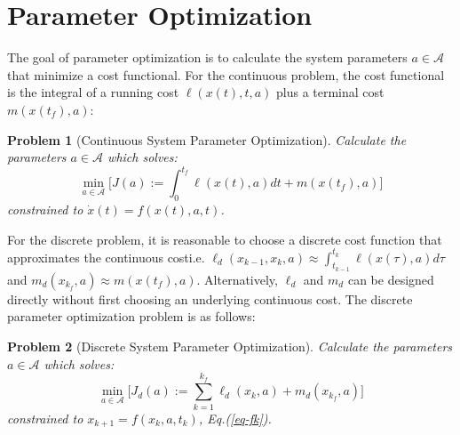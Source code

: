 \documentclass[letterpaper, 10pt, conference]{ieeeconf}
\newtheorem{problem}{Problem}
\begin{document}

\section{Parameter Optimization}
The goal of parameter optimization is to calculate the system parameters $a\in\mathcal{A}$ that minimize a cost functional.  For the continuous problem, the cost functional is the integral of a running cost $\ell(x(t),t,a)$ plus a terminal cost $m(x(t_f),a)$:
\begin{problem}[Continuous System Parameter Optimization]
Calculate the parameters $a\in\mathcal{A}$ which solves:
\[
\min_{a\in\mathcal{A}} \Big[J(a):=\int_0^{t_f}\ell(x(t),a)dt + m(x(t_f),a)\Big]
\]
constrained to $\dot{x}(t) = f(x(t),a,t)$.
\end{problem}
For the discrete problem, it is reasonable to choose a discrete cost function that approximates the continuous cost\textemdash i.e. $\ell_d(x_{k-1},x_{k},a)\approx\int_{t_{k-1}}^{t_{k}}\ell(x(\tau),a)d\tau$ and $m_d(x_{k_f},a)\approx m(x(t_f),a)$.  Alternatively, $\ell_d$ and $m_d$ can be designed directly without first choosing an underlying continuous cost.  The discrete parameter optimization problem is as follows:
\begin{problem}[Discrete System Parameter Optimization]
Calculate the parameters $a\in\mathcal{A}$ which solves:
\[
\min_{a\in\mathcal{A}} \Big[J_d(a):=\sum_{k=1}^{k_f}\ell_d(x_k,a) + m_d(x_{k_f},a)\Big]
\]
constrained to $x_{k+1} = f(x_k,a,t_k)$, Eq.(\ref{eq-fk}).
\label{prob-disc}
\end{problem}
\end{document}

